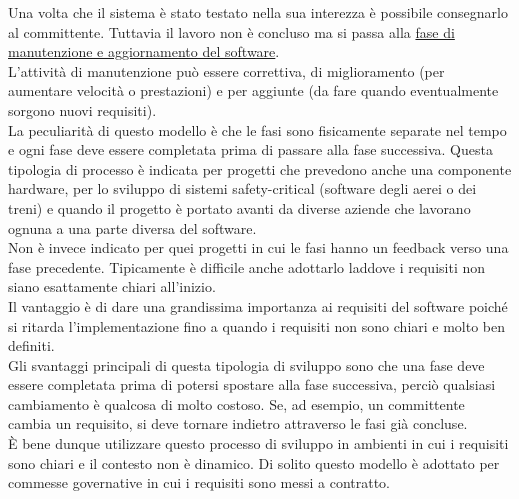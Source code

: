 Una volta che il sistema è stato testato nella sua interezza è possibile consegnarlo al committente.
Tuttavia il lavoro non è concluso ma si passa alla \underline{fase di manutenzione e aggiornamento del software}.\\
L'attività di manutenzione può essere correttiva, di miglioramento (per aumentare velocità o prestazioni) e per aggiunte (da fare quando eventualmente sorgono nuovi requisiti).\\
La peculiarità di questo modello è che le fasi sono fisicamente separate nel tempo e ogni fase deve essere completata prima di passare alla fase successiva.
Questa tipologia di processo è indicata per progetti che prevedono anche una componente hardware, per lo sviluppo di sistemi safety-critical (software degli aerei o dei treni) e quando il progetto è portato avanti da diverse aziende che lavorano ognuna a una parte diversa del software.\\
Non è invece indicato per quei progetti in cui le fasi hanno un feedback verso una fase precedente. Tipicamente è difficile anche adottarlo laddove i requisiti non siano esattamente chiari all'inizio.\\
Il vantaggio è di dare una grandissima importanza ai requisiti del software poiché si ritarda l'implementazione fino a quando i requisiti non sono chiari e molto ben definiti.\\
Gli svantaggi principali di questa tipologia di sviluppo sono che una fase deve essere completata prima di potersi spostare alla fase successiva, perciò qualsiasi cambiamento è qualcosa di molto costoso.
Se, ad esempio, un committente cambia un requisito, si deve tornare indietro attraverso le fasi già concluse.\\
È bene dunque utilizzare questo processo di sviluppo in ambienti in cui i requisiti sono chiari e il contesto non è dinamico.
Di solito questo modello è adottato per commesse governative in cui i requisiti sono messi a contratto.

